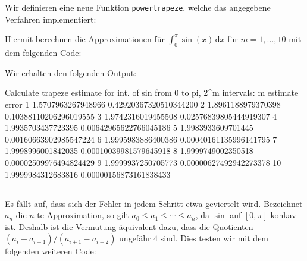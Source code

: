 \section{}
\label{section: better trapeze}





\subsection{}

Wir definieren eine neue Funktion \texttt{powertrapeze}, welche das angegebene Verfahren implementiert:



Hiermit berechnen die Approximationen für $\int_0^\pi \sin(x) \,\text{d}x$ für $m = 1, \dotsc, 10$ mit dem folgenden Code:



Wir erhalten den folgenden Output:
\begin{consoleoutput}
Calculate trapeze estimate for int. of sin from 0 to pi, 2^m intervals:
 m      estimate                error
 1      1.5707963267948966      0.42920367320510344200
 2      1.8961188979370398      0.10388110206296019555
 3      1.9742316019455508      0.02576839805444919307
 4      1.9935703437723395      0.00642965622766045186
 5      1.9983933609701445      0.00160663902985547224
 6      1.9995983886400386      0.00040161135996141795
 7      1.9998996001842035      0.00010039981579645918
 8      1.9999749002350518      0.00002509976494824429
 9      1.9999937250705773      0.00000627492942273378
10      1.9999984312683816      0.00000156873161838433
\end{consoleoutput}





\subsection{}

Es fällt auf, dass sich der Fehler in jedem Schritt etwa geviertelt wird.
Bezeichnet $a_n$ die $n$-te Approximation, so gilt $a_0 \leq a_1 \leq \dotsb \leq a_n$, da $\sin$ auf $[0,\pi]$ konkav ist.
Deshalb ist die Vermutung äquivalent dazu, dass die Quotienten $(a_i - a_{i+1})/(a_{i+1} - a_{i+2})$ ungefähr $4$ sind.
Dies testen wir mit dem folgenden weiteren Code:

